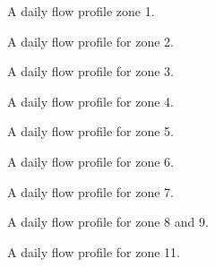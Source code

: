 \begin{figure}[H]
\centering

\caption{A daily flow profile zone 1.}
\label{fig:APP_flow_profile_thulevej}
\end{figure} 

\begin{figure}[H]
\centering

\caption{A daily flow profile for zone 2.}
\label{fig:APP_flow_profile_zone2}
\end{figure} 

\begin{figure}[H]
\centering

\caption{A daily flow profile for zone 3.}
\label{fig:APP_flow_profile_zone3}
\end{figure} 

\begin{figure}[H]
\centering

\caption{A daily flow profile for zone 4.}
\label{fig:APP_flow_profile_zone4}
\end{figure} 

\begin{figure}[H]
\centering

\caption{A daily flow profile for zone 5.}
\label{fig:APP_flow_profile_zone5}
\end{figure} 

\begin{figure}[H]
\centering

\caption{A daily flow profile for zone 6.}
\label{fig:APP_flow_profile_zone6}
\end{figure} 

\begin{figure}[H]
\centering

\caption{A daily flow profile for zone 7.}
\label{fig:APP_flow_profile_zone7}
\end{figure} 

\begin{figure}[H]
\centering

\caption{A daily flow profile for zone 8 and 9.}
\label{fig:APP_flow_profile_zone8_9}
\end{figure} 

\begin{figure}[H]
\centering

\caption{A daily flow profile for zone 11.}
\label{fig:APP_flow_profile_zone11}
\end{figure} 


